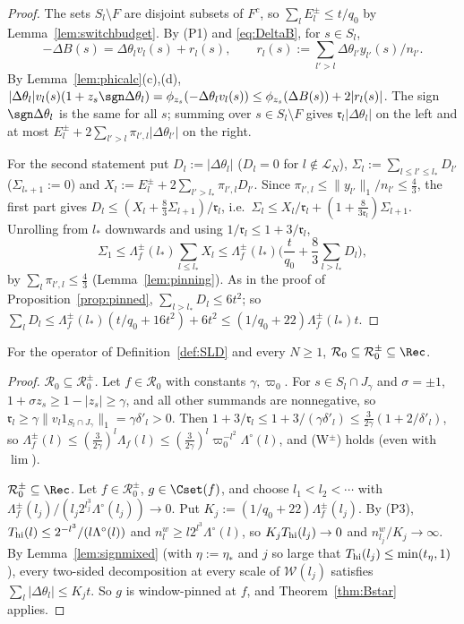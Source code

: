\begin{proof}
The sets $S_l\setminus F$ are disjoint subsets of $F^c$, so $\sum_lE^\pm_l
\le t/q_0$ by Lemma~\ref{lem:switchbudget}.  By (P1) and
\eqref{eq:DeltaB}, for $s\in S_l$,
\[
 -\Delta B(s)=\Delta\theta_lv_l(s)+r_l(s),\qquad r_l(s):=\sum_{l'>l}
 \Delta\theta_{l'}y_{l'}(s)/n_{l'} .
\]
By Lemma~\ref{lem:phicalc}(c),(d), $|\Delta\theta_l|v_l(s)(1+z_s\sgn
\Delta\theta_l)=\phi_{z_s}(-\Delta\theta_lv_l(s))\le\phi_{z_s}(\Delta B(s))+
2|r_l(s)|$.  The sign $\sgn\Delta\theta_l$ is the same for all $s$; summing
over $s\in S_l\setminus F$ gives $\mathfrak r_l|\Delta\theta_l|$ on the left
and at most $E^\pm_l+2\sum_{l'>l}\pi_{l',l}|\Delta\theta_{l'}|$ on the right.

For the second statement put $D_l:=|\Delta\theta_l|$ ($D_l=0$ for
$l\notin\mathcal L_N$), $\Sigma_l:=\sum_{l\le l'\le l_*}D_{l'}$
($\Sigma_{l_*+1}:=0$) and $X_l:=E^\pm_l+2\sum_{l'>l_*}\pi_{l',l}D_{l'}$.
Since $\pi_{l',l}\le\|y_{l'}\|_1/n_{l'}\le\frac43$, the first part gives
$D_l\le(X_l+\frac83\Sigma_{l+1})/\mathfrak r_l$, i.e.\
$\Sigma_l\le X_l/\mathfrak r_l+(1+\frac8{3\mathfrak r_l})\Sigma_{l+1}$.
Unrolling from $l_*$ downwards and using $1/\mathfrak r_l\le1+3/\mathfrak
r_l$,
\[
 \Sigma_1\le\Lambda^\pm_f(l_*)\sum_{l\le l_*}X_l\le\Lambda^\pm_f(l_*)
 \Big(\frac t{q_0}+\frac83\sum_{l>l_*}D_l\Big),
\]
by $\sum_l\pi_{l',l}\le\frac43$ (Lemma~\ref{lem:pinning}).  As in the proof
of Proposition~\ref{prop:pinned}, $\sum_{l>l_*}D_l\le6t^2$; so
$\sum_lD_l\le\Lambda^\pm_f(l_*)(t/q_0+16t^2)+6t^2\le(1/q_0+22)
\Lambda^\pm_f(l_*)t$.
\end{proof}

\begin{theorem}\label{thm:Bpm}
For the operator of Definition~\ref{def:SLD} and every $N\ge1$,
$\mathcal R_0\subseteq\mathcal R_0^\pm\subseteq\Rec$.
\end{theorem}

\begin{proof}
\emph{$\mathcal R_0\subseteq\mathcal R_0^\pm$.}  Let $f\in\mathcal R_0$
with constants $\gamma,\varpi_0$.  For $s\in S_l\cap J_\gamma$ and
$\sigma=\pm1$, $1+\sigma z_s\ge1-|z_s|\ge\gamma$, and all other summands
are nonnegative, so $\mathfrak r_l\ge\gamma\|v_l1_{S_l\cap J_\gamma}\|_1=
\gamma\delta'_l>0$.  Then $1+3/\mathfrak r_l\le1+3/(\gamma\delta'_l)\le
\frac3{2\gamma}(1+2/\delta'_l)$, so $\Lambda^\pm_f(l)\le(\frac3{2\gamma})^l
\Lambda_f(l)\le(\frac3{2\gamma})^l\varpi_0^{-l^2}\Lambda^\circ(l)$, and
(W$^\pm$) holds (even with $\lim$).

\emph{$\mathcal R_0^\pm\subseteq\Rec$.}  Let $f\in\mathcal R_0^\pm$,
$g\in\Cset(f)$, and choose $l_1<l_2<\cdots$ with $\Lambda^\pm_f(l_j)/
(l_j2^{l_j^3}\Lambda^\circ(l_j))\to0$.  Put $K_j:=(1/q_0+22)
\Lambda^\pm_f(l_j)$.  By (P3), $T_{\rm hi}(l)\le2^{-l^3}/(l\Lambda^\circ(l))$
and $n^w_l\ge l2^{l^3}\Lambda^\circ(l)$, so $K_jT_{\rm hi}(l_j)\to0$ and
$n^w_{l_j}/K_j\to\infty$.  By Lemma~\ref{lem:signmixed} (with $\eta:=\eta_*$
and $j$ so large that $T_{\rm hi}(l_j)\le\min(t_\eta,1)$), every two-sided
decomposition at every scale of $\mathcal W(l_j)$ satisfies
$\sum_l|\Delta\theta_l|\le K_jt$.  So $g$ is window-pinned at $f$, and
Theorem~\ref{thm:Bstar} applies.
\end{proof}

